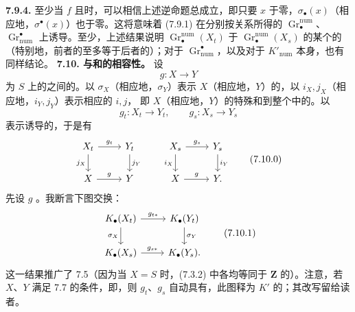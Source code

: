 \textbf{7.9.4.} 至少当 $f$ 且时，可以相信上述逆命题总成立，即只要 $x$ 于零，$\sigma_\bullet(x)$（相应地，$\sigma^\bullet(x)$）也于零。这将意味着 (7.9.1) 在分别按关系所得的 $\operatorname{Gr}_\bullet^{\mathrm{num}}$、$\operatorname{Gr}^{\bullet}_{\mathrm{num}}$ 上诱导。至少，上述结果说明 $\operatorname{Gr}_\bullet^{\mathrm{num}}(X_t)$ 于 $\operatorname{Gr}_\bullet^{\mathrm{num}}(X_s)$ 的某个的（特别地，前者的至多等于后者的）；对于 $\operatorname{Gr}^{\bullet}_{\mathrm{num}}$，以及对于 $K'_{\mathrm{num}}$ 本身，也有同样结论。
\textbf{7.10. 与和的相容性。}
设
\[g:X\longrightarrow Y\]
为 $S$ 上的之间的。以 $\sigma_X$（相应地，$\sigma_Y$）表示 $X$（相应地，$Y$）的，以 $i_X,j_X$（相应地，$i_Y,j_Y$）表示相应的 $i,j$，
即 $X$（相应地，$Y$）的特殊和到整个中的。以
\[g_t:X_t\longrightarrow Y_t,\qquad g_s:X_s\longrightarrow Y_s\]
表示诱导的，于是有
\[\begin{tikzcd}X_t\arrow[r,"g_t"]\arrow[d,"j_X"']&Y_t\arrow[d,"j_Y"]\\X\arrow[r,"g"]&Y\end{tikzcd}\qquad\begin{tikzcd}X_s\arrow[r,"g_s"]\arrow[d,"i_X"']&Y_s\arrow[d,"i_Y"]\\X\arrow[r,"g"]&Y.\end{tikzcd}\tag{7.10.0}\]
先设 $g$ 。我断言下图交换：
\[\begin{tikzcd}K_\bullet(X_t)\arrow[r,"g_{t*}"]\arrow[d,"\sigma_X"']&K_\bullet(Y_t)\arrow[d,"\sigma_Y"]\\K_\bullet(X_s)\arrow[r,"g_{s*}"]&K_\bullet(Y_s).\end{tikzcd}\tag{7.10.1}\]
这一结果推广了 7.5（因为当 $X=S$ 时，(7.3.2) 中各均等同于 $\mathbf Z$ 的）。注意，若 $X$、$Y$ 满足 7.7 的条件，即，则 $g_t$、$g_s$ 自动具有，此图释为 $K'$ 的；其改写留给读者。

